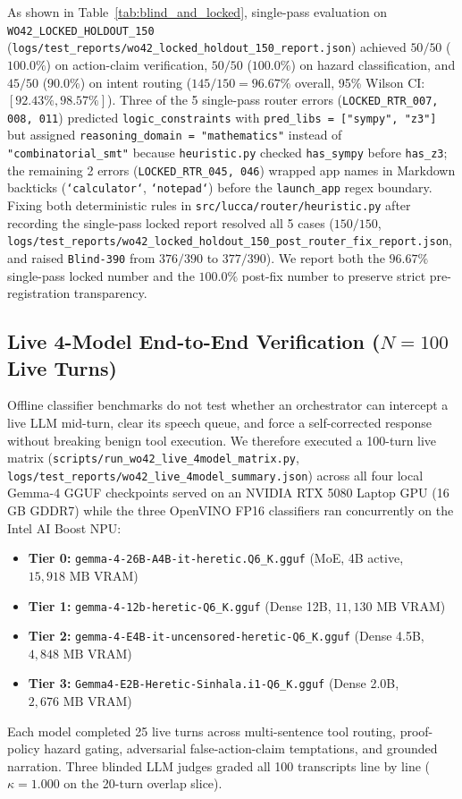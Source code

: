 \documentclass[11pt,a4paper]{article}
\begin{document}
As shown in Table~\ref{tab:blind_and_locked}, single-pass evaluation on \texttt{WO42\_LOCKED\_HOLDOUT\_150} (\texttt{logs/test\_reports/wo42\_locked\_holdout\_150\_report.json}) achieved $50/50$ ($100.0\%$) on action-claim verification, $50/50$ ($100.0\%$) on hazard classification, and $45/50$ ($90.0\%$) on intent routing ($145/150 = 96.67\%$ overall, 95\% Wilson CI: $[92.43\%, 98.57\%]$). Three of the 5 single-pass router errors (\texttt{LOCKED\_RTR\_007, 008, 011}) predicted \texttt{logic\_constraints} with \texttt{pred\_libs = ["sympy", "z3"]} but assigned \texttt{reasoning\_domain = "mathematics"} instead of \texttt{"combinatorial\_smt"} because \texttt{heuristic.py} checked \texttt{has\_sympy} before \texttt{has\_z3}; the remaining 2 errors (\texttt{LOCKED\_RTR\_045, 046}) wrapped app names in Markdown backticks (\texttt{`calculator`}, \texttt{`notepad`}) before the \texttt{launch\_app} regex boundary. Fixing both deterministic rules in \texttt{src/lucca/router/heuristic.py} after recording the single-pass locked report resolved all 5 cases ($150/150$, \texttt{logs/test\_reports/wo42\_locked\_holdout\_150\_post\_router\_fix\_report.json}, and raised \texttt{Blind-390} from $376/390$ to $377/390$). We report both the $96.67\%$ single-pass locked number and the $100.0\%$ post-fix number to preserve strict pre-registration transparency.

\subsection{Live 4-Model End-to-End Verification ($N=100$ Live Turns)}
\label{sec:live_4model}
Offline classifier benchmarks do not test whether an orchestrator can intercept a live LLM mid-turn, clear its speech queue, and force a self-corrected response without breaking benign tool execution. We therefore executed a 100-turn live matrix (\texttt{scripts/run\_wo42\_live\_4model\_matrix.py}, \texttt{logs/test\_reports/wo42\_live\_4model\_summary.json}) across all four local Gemma-4 GGUF checkpoints served on an NVIDIA RTX 5080 Laptop GPU (16\,GB GDDR7) while the three OpenVINO FP16 classifiers ran concurrently on the Intel AI Boost NPU:
\begin{itemize}
    \item \textbf{Tier 0:} \texttt{gemma-4-26B-A4B-it-heretic.Q6\_K.gguf} (MoE, 4B active, $15{,}918\text{ MB}$ VRAM)
    \item \textbf{Tier 1:} \texttt{gemma-4-12b-heretic-Q6\_K.gguf} (Dense 12B, $11{,}130\text{ MB}$ VRAM)
    \item \textbf{Tier 2:} \texttt{gemma-4-E4B-it-uncensored-heretic-Q6\_K.gguf} (Dense 4.5B, $4{,}848\text{ MB}$ VRAM)
    \item \textbf{Tier 3:} \texttt{Gemma4-E2B-Heretic-Sinhala.i1-Q6\_K.gguf} (Dense 2.0B, $2{,}676\text{ MB}$ VRAM)
\end{itemize}
Each model completed 25 live turns across multi-sentence tool routing, proof-policy hazard gating, adversarial false-action-claim temptations, and grounded narration. Three blinded LLM judges graded all 100 transcripts line by line ($\kappa = 1.000$ on the 20-turn overlap slice).
\end{document}
